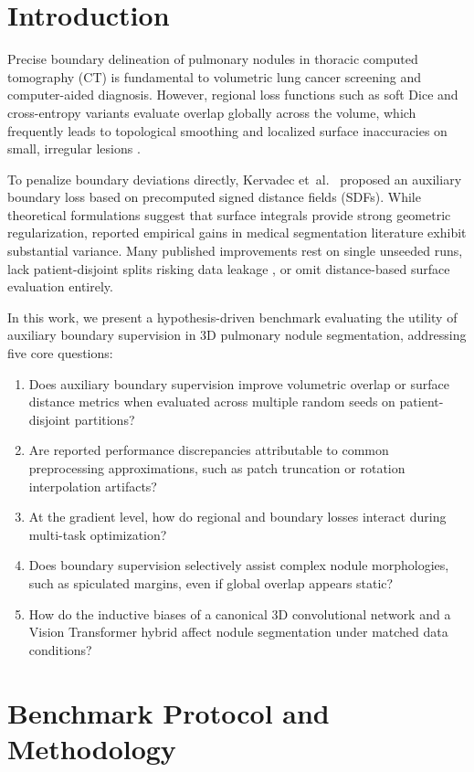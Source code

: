 \documentclass[10pt, a4paper, twocolumn]{article}
\begin{document}
\section{Introduction}
Precise boundary delineation of pulmonary nodules in thoracic computed tomography (CT) is fundamental to volumetric lung cancer screening and computer-aided diagnosis. However, regional loss functions such as soft Dice and cross-entropy variants evaluate overlap globally across the volume, which frequently leads to topological smoothing and localized surface inaccuracies on small, irregular lesions \cite{ma2021loss}.

To penalize boundary deviations directly, Kervadec et~al.~\cite{kervadec2019boundary} proposed an auxiliary boundary loss based on precomputed signed distance fields (SDFs). While theoretical formulations suggest that surface integrals provide strong geometric regularization, reported empirical gains in medical segmentation literature exhibit substantial variance. Many published improvements rest on single unseeded runs, lack patient-disjoint splits risking data leakage \cite{varoquaux2022machine}, or omit distance-based surface evaluation entirely.

In this work, we present a hypothesis-driven benchmark evaluating the utility of auxiliary boundary supervision in 3D pulmonary nodule segmentation, addressing five core questions:
\begin{enumerate}
    \item Does auxiliary boundary supervision improve volumetric overlap or surface distance metrics when evaluated across multiple random seeds on patient-disjoint partitions?
    \item Are reported performance discrepancies attributable to common preprocessing approximations, such as patch truncation or rotation interpolation artifacts?
    \item At the gradient level, how do regional and boundary losses interact during multi-task optimization?
    \item Does boundary supervision selectively assist complex nodule morphologies, such as spiculated margins, even if global overlap appears static?
    \item How do the inductive biases of a canonical 3D convolutional network and a Vision Transformer hybrid affect nodule segmentation under matched data conditions?
\end{enumerate}

\section{Benchmark Protocol and Methodology}
\end{document}
